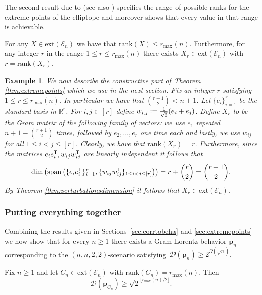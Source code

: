 \documentclass{siamart}
\newtheorem{example}{Example}[section]
\begin{document}
{The second result due to \cite{GPW} (see also \cite[Proposition
31.5.7]{DL}) specifies the range of possible ranks for the  extreme
points of the elliptope and moreover shows that every value  in that
range is {achievable}.

\medskip
\begin{theorem}\label{thm:extremepoints}
For any $X\in {\mathrm{ext}} ({\mathcal{E}}_n)$   we have that ${\mathrm{rank}}(X)\le r_{\max}(n)$. Furthermore, for any integer $r$ in the  range  $1\le r\le r_{\max}(n)$ there exists $X_r\in {\mathrm{ext}} ({\mathcal{E}}_n)$ with $r={\mathrm{rank}}(X_r)$.
\end{theorem}
\medskip

\begin{example}\label{ex:extremepointconstruction}
We now describe the constructive part of Theorem \ref{thm:extremepoints} which we use in the next section.
Fix an integer  $r$ satisfying $1\le r\le r_{\max}(n)$.   In particular we have that $\binom{r+1}{2} < n+1$. Let $\{e_i\}_{i=1}^r$ be the standard basis in ${\mathbb{R}}^r$. For $i,j\in [r]$ define $w_{i,j}:={1\over \sqrt{2}}(e_i+e_j)$.  Define  $X_r$ to  be the Gram matrix of the following  family of vectors:   we use $e_1$  repeated $n+1- \binom{r+1}{2}$ times,  followed by  $e_2,\ldots, e_r$ one time each and lastly,  we use $w_{ij}$ for all $ 1\le i<j\le [r]$. Clearly,  we have that ${\mathrm{rank}}(X_r)=r$. Furthermore, since the matrices $e_ie_i^{{\sf T}},w_{ij}w_{ij}^{{\sf T}}$ are linearly independent it follows that
$$\dim \left( {\mathrm{span}}\left(\{e_ie_i^{{\sf T}}\}_{i=1}^r, \{ w_{ij}w_{ij}^{{\sf T}}\}_{1\le i<j\le [r]} \right) \right)=r+\binom{r}{2}=\binom{r+1}{2}.$$
By Theorem \ref{thm:perturbationsdimension} it follows that  $X_r\in {\mathrm{ext}} ({\mathcal{E}}_n)$.
\end{example}

\subsubsection{Putting everything together}\label{sec:puttingeverythingtogether}

Combining the results given in Sections~\ref{sec:corrtobeha} and \ref{sec:extremepoints} we   now  show that for every $n\ge 1$ there exists a Gram-Lorentz behavior ${\mathbf{p}}_n$ corresponding to the $(n,n,2,2)$-scenario satisfying~$\mathcal{D}({\mathbf{p}}_n)\ge 2^{\Omega(\sqrt{n})}.$

\begin{theorem}\label{thm:GLbehaviorlowerbound}
Fix $n\ge 1$  and let $C_n\in {\mathrm{ext}} ({\mathcal{E}}_n)$ with  ${\mathrm{rank}}(C_n)=r_{\max}(n)$. Then
$$\mathcal{D}({\mathbf{p}}_{C_n})\ge  {\sqrt{2}^{\lfloor {r_{\max}}(n)/ 2\rfloor}}.$$
\end{theorem}

}
\end{document}
